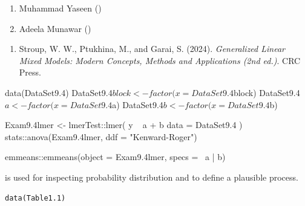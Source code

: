 \documentclass[a4paper]{book}
\begin{document}
%
\begin{Author}
\begin{enumerate}

\item{}  Muhammad Yaseen ()
\item{} Adeela Munawar ()

\end{enumerate}

\end{Author}
%
\begin{References}
\begin{enumerate}

\item{} Stroup, W. W., Ptukhina, M., and Garai, S. (2024).
\emph{Generalized Linear Mixed Models: Modern Concepts, Methods and Applications (2nd ed.)}.
CRC Press.

\end{enumerate}

\end{References}
%
\begin{SeeAlso}
\end{SeeAlso}
%
\begin{Examples}
\begin{ExampleCode}

data(DataSet9.4)
DataSet9.4$block <- factor(x = DataSet9.4$block)
DataSet9.4$a <- factor(x = DataSet9.4$a)
DataSet9.4$b <- factor(x = DataSet9.4$b)

Exam9.4lmer <- lmerTest::lmer(
  y ~ a + b %
  data = DataSet9.4
)
stats::anova(Exam9.4lmer, ddf = "Kenward-Roger")

emmeans::emmeans(object = Exam9.4lmer, specs = ~a | b)
\end{ExampleCode}
\end{Examples}
%
\begin{Description}
 is used for inspecting probability distribution and to define a plausible process.
\end{Description}
%
\begin{Usage}
\begin{verbatim}
data(Table1.1)
\end{verbatim}
\end{Usage}
\end{document}
